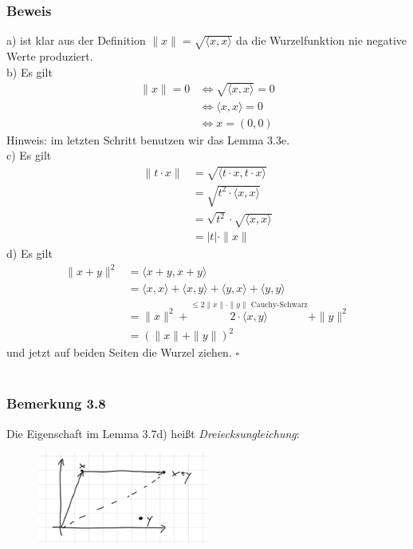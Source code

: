 \documentclass{article}
\begin{document}
\subsubsection*{Beweis}
a) ist klar aus der Definition $\|x\| = \sqrt{\langle x,x \rangle}$ da die Wurzelfunktion nie negative Werte produziert. \\
b) Es gilt \\
\begin{align*}
    \|x\| = 0 &\Leftrightarrow \sqrt{\langle x,x \rangle} = 0 \\
    &\Leftrightarrow \langle x,x \rangle = 0 \\
    &\Leftrightarrow x = (0,0)
\end{align*}
Hinweis: im letzten Schritt benutzen wir das Lemma 3.3e. \\
c) Es gilt \\
\begin{align*}
    \|t \cdot x\| &= \sqrt{\langle t \cdot x, t \cdot x \rangle} \\
    &= \sqrt{t^2 \cdot \langle x,x \rangle} \\
    &= \sqrt{t^2} \cdot \sqrt{\langle x,x \rangle} \\
    &= |t| \cdot \|x\|
\end{align*}
d) Es gilt \\
\begin{align*}
    \|x+y\|^2 &= \langle x+y, x+y \rangle \\
    &= \langle x,x \rangle + \langle x,y \rangle + \langle y,x \rangle + \langle y,y \rangle \\
    &= \|x\|^2 + \overset{\text{$\leq 2 \|x\| \cdot \|y\|$ Cauchy-Schwarz}}{2 \cdot \langle x,y \rangle} + \|y\|^2 \\
    &= (\|x\| + \|y\|)^2
\end{align*}
und jetzt auf beiden Seiten die Wurzel ziehen. $\square$ \\
\\
\subsubsection*{Bemerkung 3.8}
Die Eigenschaft im Lemma 3.7d) heißt \textit{Dreiecksungleichung}: \\

\begin{figure}[h]
    \centering
    \includegraphics[width=0.5\textwidth]{Images/3.8.jpeg}

\end{figure}
\end{document}

